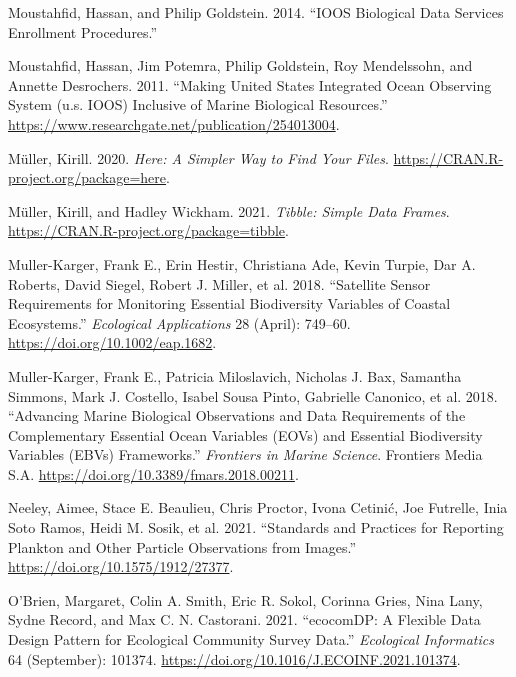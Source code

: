 \documentclass[
]{book}
\newlength{\cslhangindent}
\newlength{\cslentryspacingunit} %
\newenvironment{CSLReferences}[2] %
 {%
  \setlength{\parindent}{0pt}
  \ifodd #1
  \let\oldpar\par
  \def\par{\hangindent=\cslhangindent\oldpar}
  \fi
  \setlength{\parskip}{#2\cslentryspacingunit}
 }%
 {}
\begin{document}
\begin{CSLReferences}{1}{0}
\leavevmode{}%
Moustahfid, Hassan, and Philip Goldstein. 2014. {``IOOS Biological Data Services Enrollment Procedures.''}

\leavevmode{}%
Moustahfid, Hassan, Jim Potemra, Philip Goldstein, Roy Mendelssohn, and Annette Desrochers. 2011. {``Making United States Integrated Ocean Observing System (u.s. IOOS) Inclusive of Marine Biological Resources.''} \url{https://www.researchgate.net/publication/254013004}.

\leavevmode{}%
Müller, Kirill. 2020. \emph{Here: A Simpler Way to Find Your Files}. \url{https://CRAN.R-project.org/package=here}.

\leavevmode{}%
Müller, Kirill, and Hadley Wickham. 2021. \emph{Tibble: Simple Data Frames}. \url{https://CRAN.R-project.org/package=tibble}.

\leavevmode{}%
Muller-Karger, Frank E., Erin Hestir, Christiana Ade, Kevin Turpie, Dar A. Roberts, David Siegel, Robert J. Miller, et al. 2018. {``Satellite Sensor Requirements for Monitoring Essential Biodiversity Variables of Coastal Ecosystems.''} \emph{Ecological Applications} 28 (April): 749--60. \url{https://doi.org/10.1002/eap.1682}.

\leavevmode{}%
Muller-Karger, Frank E., Patricia Miloslavich, Nicholas J. Bax, Samantha Simmons, Mark J. Costello, Isabel Sousa Pinto, Gabrielle Canonico, et al. 2018. {``Advancing Marine Biological Observations and Data Requirements of the Complementary Essential Ocean Variables (EOVs) and Essential Biodiversity Variables (EBVs) Frameworks.''} \emph{Frontiers in Marine Science}. Frontiers Media S.A. \url{https://doi.org/10.3389/fmars.2018.00211}.

\leavevmode{}%
Neeley, Aimee, Stace E. Beaulieu, Chris Proctor, Ivona Cetinić, Joe Futrelle, Inia Soto Ramos, Heidi M. Sosik, et al. 2021. {``Standards and Practices for Reporting Plankton and Other Particle Observations from Images.''} \url{https://doi.org/10.1575/1912/27377}.

\leavevmode{}%
O'Brien, Margaret, Colin A. Smith, Eric R. Sokol, Corinna Gries, Nina Lany, Sydne Record, and Max C. N. Castorani. 2021. {``ecocomDP: A Flexible Data Design Pattern for Ecological Community Survey Data.''} \emph{Ecological Informatics} 64 (September): 101374. \url{https://doi.org/10.1016/J.ECOINF.2021.101374}.


\end{CSLReferences}
\end{document}
